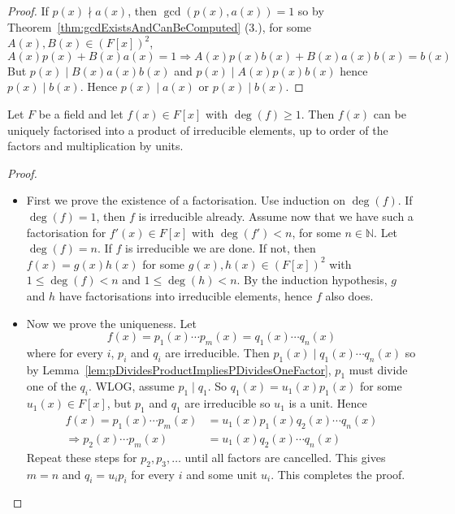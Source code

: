 \begin{proof}
	If $p(x) \nmid a(x)$, then $\gcd(p(x), a(x)) = 1$ so by Theorem~\ref{thm:gcdExistsAndCanBeComputed} (3.), for some $A(x), B(x) \in {(F[x])}^2$,
	\[
		A(x) p(x) + B(x) a(x) = 1 \Longrightarrow A(x) p(x) b(x) + B(x) a(x) b(x) = b(x)
	\]
	But $p(x) \mid B(x) a(x) b(x)$ and $p(x) \mid A(x) p(x) b(x)$ hence $p(x) \mid b(x)$. Hence $p(x) \mid a(x)$ or $p(x) \mid b(x)$.
\end{proof}

\begin{theorem}\label{thm:uniqueFactorisationInPolynomialOverField}
	Let $F$ be a field and let $f(x) \in F[x]$ with $\deg(f) \ge 1$. Then $f(x)$ can be uniquely factorised into a product of irreducible elements, up to order of the factors and multiplication by units.
\end{theorem}

\begin{proof}
	\begin{itemize}
		\item First we prove the existence of a factorisation. Use induction on $\deg(f)$. If $\deg(f) = 1$, then $f$ is irreducible already. Assume now that we have such a factorisation for $f'(x) \in F[x]$ with $\deg(f') < n$, for some $n \in \mathbb{N}$. Let $\deg(f) = n$. If $f$ is irreducible we are done. If not, then $f(x) = g(x) h(x)$ for some $g(x), h(x) \in {(F[x])}^2$ with $1 \le \deg(f) < n$ and $1 \le \deg(h) < n$. By the induction hypothesis, $g$ and $h$ have factorisations into irreducible elements, hence $f$ also does.
		\item Now we prove the uniqueness. Let
		\[
			f(x) = p_1 (x) \cdots p_m(x) = q_1(x) \cdots q_n(x)
		\]
		where for every $i$, $p_i$ and $q_i$ are irreducible. Then $p_1(x) \mid q_1(x) \cdots q_n(x)$ so by Lemma~\ref{lem:pDividesProductImpliesPDividesOneFactor}, $p_1$ must divide one of the $q_i$. WLOG, assume $p_1 \mid q_1$. So $q_1(x) = u_1(x) p_1(x)$ for some $u_1(x) \in F[x]$, but $p_1$ and $q_1$ are irreducible so $u_1$ is a unit. Hence
		\[
			\begin{aligned}
				f(x) = p_1 (x) \cdots p_m(x) & = u_1(x) p_1(x) q_2(x) \cdots q_n(x) \\
				\Longrightarrow p_2 (x) \cdots p_m(x) & = u_1(x) q_2(x) \cdots q_n(x)
			\end{aligned}
		\]
		Repeat these steps for $p_2, p_3, \dots$ until all factors are cancelled. This gives $m = n$ and $q_i = u_i p_i$ for every $i$ and some unit $u_i$. This completes the proof.
	\end{itemize}
\end{proof}

